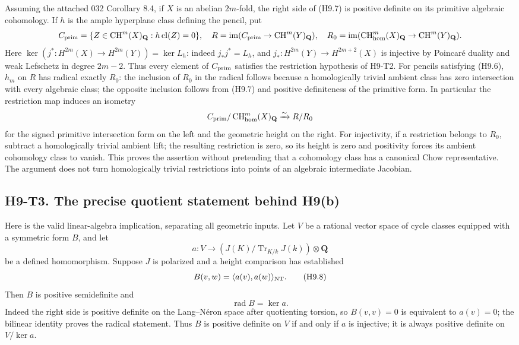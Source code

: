 Assuming the attached 032 Corollary 8.4, if $X$ is an abelian $2m$-fold,
the right side of (H9.7) is positive definite on its primitive algebraic
cohomology. If $h$ is the ample hyperplane class defining the pencil, put
\[
 C_{\rm prim}=\{Z\in\operatorname{CH}^m(X)_{\mathbf Q}:
                          h\operatorname{cl}(Z)=0\},\quad
 R=\operatorname{im}(C_{\rm prim}\to\operatorname{CH}^m(Y)_{\mathbf Q}),
 \quad
 R_0=\operatorname{im}(\operatorname{CH}^m_{\rm hom}(X)_{\mathbf Q}
                         \to\operatorname{CH}^m(Y)_{\mathbf Q}).
\]
Here $\ker(j^*:H^{2m}(X)\to H^{2m}(Y))=\ker L_h$: indeed
$j_*j^*=L_h$, and $j_*:H^{2m}(Y)\to H^{2m+2}(X)$ is injective by
Poincar\'e duality and weak Lefschetz in degree $2m-2$. Thus every element
of $C_{\rm prim}$ satisfies the restriction hypothesis of H9-T2.
For pencils satisfying (H9.6), $h_m$ on $R$ has radical exactly $R_0$:
the inclusion of $R_0$ in the radical follows because a homologically
trivial ambient class has zero intersection with every algebraic class;
the opposite inclusion follows from (H9.7) and positive definiteness of
the primitive form. In particular the restriction map induces an
isometry
\[
 C_{\rm prim}/\operatorname{CH}^m_{\rm hom}(X)_{\mathbf Q}
       \xrightarrow{\sim}R/R_0
\]
for the signed primitive intersection form on the left and the geometric
height on the right. For injectivity, if a restriction belongs to $R_0$,
subtract a homologically trivial ambient lift; the resulting restriction
is zero, so its height is zero and positivity forces its ambient
cohomology class to vanish. This proves the assertion without pretending
that a cohomology class has a canonical Chow representative. The argument
does not turn homologically trivial restrictions into points of an
algebraic intermediate Jacobian.

\subsection*{H9-T3. The precise quotient statement behind H9(b)}

Here is the valid linear-algebra implication, separating all geometric
inputs. Let $V$ be a rational vector space of cycle classes equipped with
a symmetric form $B$, and let
\[
 a:V\longrightarrow
 (J(K)/\operatorname{Tr}_{K/k}J(k))\otimes\mathbf Q
\]
be a defined homomorphism. Suppose $J$ is polarized and a height comparison
has established
\[
 B(v,w)=\langle a(v),a(w)\rangle_{\rm NT}.
                                                        \tag{H9.8}
\]
Then $B$ is positive semidefinite and
\[
 \operatorname{rad}B=\ker a.
\]
Indeed the right side is positive definite on the Lang--N\'eron space
after quotienting torsion, so $B(v,v)=0$ is equivalent to $a(v)=0$; the
bilinear identity proves the radical statement. Thus $B$ is positive
definite on $V$ if and only if $a$ is injective; it is always positive
definite on $V/\ker a$.

